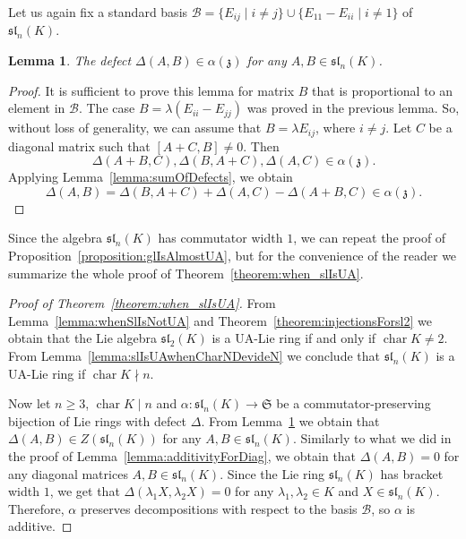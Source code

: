 \documentclass[a4paper,reqno,12pt]{amsart}
\newtheorem{lemma}[proposition]{Lemma}
\theoremstyle{definition}
\theoremstyle{remark}
\DeclareMathOperator{\Char}{char}
\def\SSS{\mathfrak{S}}
\def\zzz{\mathfrak{z}}
\def\sl{\mathfrak{sl}}
\renewcommand{\ge}{\geqslant}
\begin{document}
	Let us again fix a standard basis $\mathcal{B} = \lbrace E_{ij} \mid i \neq j \rbrace \cup \lbrace E_{11} - E_{ii} \mid i \neq 1 \rbrace$ of $\sl_n(K)$.

	\begin{lemma}\label{lemma:almostAdditiveInSl}
		The defect $\Delta(A, B) \in \alpha(\zzz)$ for any $A, B \in \sl_n(K)$.
	\end{lemma}

	\begin{proof}
		It is sufficient to prove this lemma for matrix $B$ that is proportional to an element in $\mathcal{B}$. The case $B = \lambda(E_{ii} - E_{jj})$ was proved in the previous lemma. So, without loss of generality, we can assume that $B = \lambda E_{ij}$, where $i \neq j$. Let $C$ be a diagonal matrix such that $[A + C, B] \neq 0$. Then
		\begin{equation*}
			\Delta(A + B, C), \Delta(B, A + C), \Delta(A, C) \in \alpha(\zzz).
		\end{equation*}
		Applying Lemma~\ref{lemma:sumOfDefects}, we obtain
		\begin{equation*}
			\Delta(A, B) = \Delta(B, A + C) + \Delta(A, C) - \Delta(A + B, C) \in \alpha(\zzz).
		\end{equation*}
	\end{proof}

	Since the algebra $\sl_n(K)$ has commutator width $1$, we can repeat the proof of Proposition~\ref{proposition:glIsAlmostUA}, but for the convenience of the reader we summarize the whole proof of Theorem~\ref{theorem:when_slIsUA}.

	\begin{proof}[Proof of Theorem~\ref{theorem:when_slIsUA}]
		From Lemma~\ref{lemma:whenSlIsNotUA} and Theorem~\ref{theorem:injectionsForsl2} we obtain that the Lie algebra $\sl_2(K)$ is a UA-Lie ring if and only if $\Char K \neq 2$. From Lemma~\ref{lemma:slIsUAwhenCharNDevideN} we conclude that $\sl_n(K)$ is a UA-Lie ring if $\Char K \nmid n$.
		
		Now let $n \ge 3$, $\Char K \mid n$ and $\alpha : \sl_n(K) \rightarrow \SSS$ be a commutator-preserving bijection of Lie rings with defect $\Delta$. From Lemma~\ref{lemma:almostAdditiveInSl} we obtain that $\Delta(A, B) \in Z(\sl_n(K))$ for any $A, B \in \sl_n(K)$. Similarly to what we did in the proof of Lemma~\ref{lemma:additivityForDiag}, we obtain that $\Delta(A, B) = 0$ for any diagonal matrices $A, B \in \sl_n(K)$. Since the Lie ring $\sl_n(K)$ has bracket width $1$, we get that $\Delta(\lambda_1 X, \lambda_2 X) = 0$ for any $\lambda_1, \lambda_2 \in K$ and $X \in \sl_n(K)$. Therefore, $\alpha$ preserves decompositions with respect to the basis $\mathcal{B}$, so $\alpha$ is additive.
	\end{proof}
\end{document}
